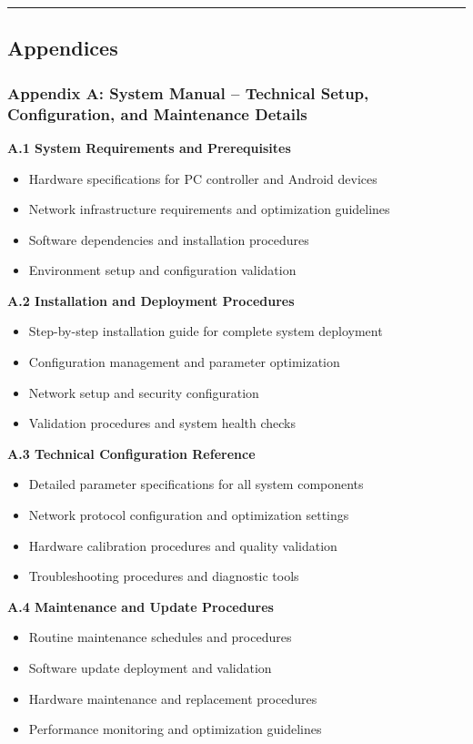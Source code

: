 \documentclass[12pt,a4paper]{report}
\begin{document}
\hrule

\subsection{Appendices}

\subsubsection{Appendix A: System Manual – Technical Setup, Configuration, and Maintenance Details}

\textbf{A.1 System Requirements and Prerequisites}

\begin{itemize}
\item Hardware specifications for PC controller and Android devices
\item Network infrastructure requirements and optimization guidelines
\item Software dependencies and installation procedures
\item Environment setup and configuration validation

\end{itemize}
\textbf{A.2 Installation and Deployment Procedures}

\begin{itemize}
\item Step-by-step installation guide for complete system deployment
\item Configuration management and parameter optimization
\item Network setup and security configuration
\item Validation procedures and system health checks

\end{itemize}
\textbf{A.3 Technical Configuration Reference}

\begin{itemize}
\item Detailed parameter specifications for all system components
\item Network protocol configuration and optimization settings
\item Hardware calibration procedures and quality validation
\item Troubleshooting procedures and diagnostic tools

\end{itemize}
\textbf{A.4 Maintenance and Update Procedures}

\begin{itemize}
\item Routine maintenance schedules and procedures
\item Software update deployment and validation
\item Hardware maintenance and replacement procedures
\item Performance monitoring and optimization guidelines

\end{itemize}
\end{document}
